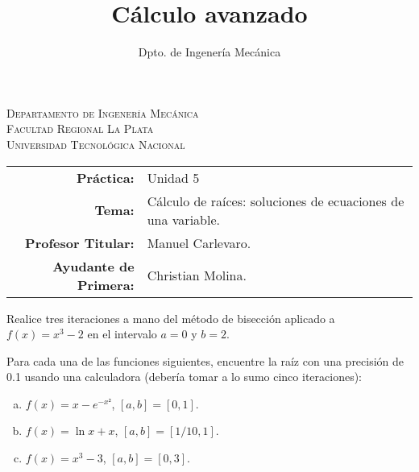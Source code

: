 \documentclass[11pt]{article}
\title{Cálculo avanzado}
\author{Dpto. de Ingenería Mecánica}
\begin{document}

\begin{center}
\end{center} 

\begin{center}
\vspace{\baselineskip}
\Large{\textsc{Departamento de Ingenería Mecánica}} \\
\textsc{Facultad Regional La Plata} \\
\textsc{Universidad Tecnológica Nacional}
\end{center}


\begin{center}
\begin{tabular}{r l}
    \textbf{Práctica:} & Unidad 5 \\
 \textbf{Tema:} & Cálculo de raíces: soluciones de ecuaciones de una variable. \\
 \textbf{Profesor Titular:} & Manuel Carlevaro. \\
 \textbf{Ayudante de Primera:} & Christian Molina.
\end{tabular}\end{center}

\vspace{1em}

\begin{question} %
Realice tres iteraciones a mano del método de bisección aplicado a $f(x) = x^3 - 2$ en el intervalo $a = 0$ y $b=2$.
\end{question}

\begin{question} %
Para cada una de las funciones siguientes, encuentre la raíz con una precisión de 0.1 usando una calculadora (debería tomar a lo sumo cinco iteraciones):
\begin{enumerate}[a)]
    \item $f(x) = x - e^{-x²}$, $[a, b] = [0, 1]$.
    \item $f(x) = \ln x + x$,  $[a, b] = [1/10, 1]$.
    \item $f(x) = x^3 - 3$,  $[a, b] = [0, 3]$.
\end{enumerate}
\end{question}
\end{document}
